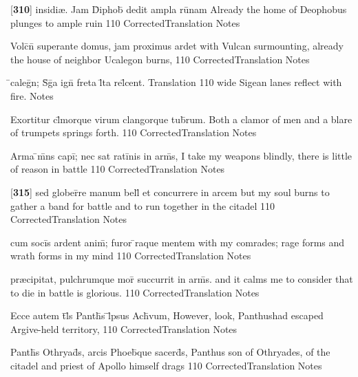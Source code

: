 \latline
  {[\textbf{310}] insidi{\ae}.  Jam D\={}iphob\={\macron {\i}} dedit ampla ru\={\macron {\i}}nam}
  { Already the home of Deophobus plunges to ample ruin  }
  {110}
  { CorrectedTranslation }
  { Notes }


\latline
  {Volc\={}n\={} superante domus, jam proximus ardet}
  { with Vulcan surmounting, already the house of neighbor Ucalegon burns, }
  {110}
  { CorrectedTranslation }
  { Notes }


\latline
  {\={}caleg\={}n; S\={\macron {\i}}g\={}a ign\={\macron {\i}} freta l\={}ta rel\={}cent.}
  { Translation }
  {110}
  { wide Sigean lanes reflect with fire. }
  { Notes }


\latline
  {Exortitur cl\={}morque virum clangorque tub\={}rum.}
  { Both a clamor of men and a blare of trumpets springs forth. }
  {110}
  { CorrectedTranslation }
  { Notes }


\latline
  {Arma \={}m\={}ns capi\={}; nec sat rati\={}nis in arm\={\macron {\i}}s,}
  { I take my weapons blindly, there is little of reason in battle }
  {110}
  { CorrectedTranslation }
  { Notes }


\latline
  {[\textbf{315}] sed glober\={}re manum bell\={} et concurrere in arcem }
  { but my soul burns to gather a band for battle and to run together in the citadel }
  {110}
  { CorrectedTranslation }
  { Notes }


\latline
  {cum soci\={\macron {\i}}s ardent anim\={\macron {\i}}; furor \={\macron {\i}}raque mentem}
  { with my comrades; rage forms and wrath forms in my mind }
  {110}
  { CorrectedTranslation }
  { Notes }


\latline
  {pr{\ae}cipitat, pulchrumque mor\={\macron {\i}} succurrit in arm\={\macron {\i}}s.}
  { and it calms me to consider that to die in battle is glorious. }
  {110}
  { CorrectedTranslation }
  { Notes }


\latline
  {Ecce autem t\={}l\={\macron {\i}}s Panth\={}s \={}l\={}psus Ach\={\macron {\i}}vum,}
  { However, look, Panthushad escaped Argive-held territory, }
  {110}
  { CorrectedTranslation }
  { Notes }


\latline
  {Panth\={}s Othryad\={}s, arcis Phoeb\={\macron {\i}}que sacerd\={}s,}
  { Panthus son of Othryades, of the citadel and priest of Apollo himself drags }
  {110}
  { CorrectedTranslation }
  { Notes }


